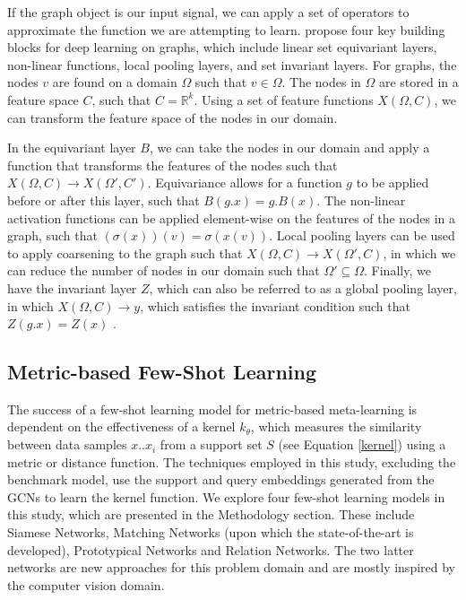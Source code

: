 If the graph object is our input signal, we can apply a set of operators to approximate the function we are attempting to learn. \citet{bronstein2021geometric} propose four key building blocks for deep learning on graphs, which include linear set equivariant layers, non-linear functions, local pooling layers, and set invariant layers. For graphs, the nodes $v$ are found on a domain $\Omega$ such that $v \in \Omega$. The nodes in $\Omega$ are stored in a feature space $C$, such that $C = \mathbb{R}^k$. Using a set of feature functions $X(\Omega, C)$, we can transform the feature space of the nodes in our domain. 

In the equivariant layer $B$, we can take the nodes in our domain and apply a function that transforms the features of the nodes such that $X(\Omega, C) \rightarrow X(\Omega', C')$. Equivariance allows for a function $g$ to be applied before or after this layer, such that $B(g.x) = g.B(x)$. The non-linear activation functions can be applied element-wise on the features of the nodes in a graph, such that $(\sigma(x))(v) = \sigma(x(v))$. Local pooling layers can be used to apply coarsening to the graph such that $X(\Omega, C) \rightarrow X(\Omega', C)$, in which we can reduce the number of nodes in our domain such that $\Omega' \subseteq \Omega$. Finally, we have the invariant layer $Z$, which can also be referred to as a global pooling layer, in which $X(\Omega, C) \rightarrow y$, which satisfies the invariant condition such that $Z(g.x) = Z(x)$ \citep{bronstein2021geometric}. 



\subsection{Metric-based Few-Shot Learning}

The success of a few-shot learning model for metric-based meta-learning is dependent on the effectiveness of a kernel $k_\theta$, which measures the similarity between data samples ${x..x_i}$ from a support set $S$ (see Equation \ref{kernel}) using a metric or distance function. The techniques employed in this study, excluding the benchmark model, use the support and query embeddings generated from the GCNs to learn the kernel function. We explore four few-shot learning models in this study, which are presented in the Methodology section. These include Siamese Networks, Matching Networks (upon which the state-of-the-art is developed), Prototypical Networks and Relation Networks. The two latter networks are new approaches for this problem domain and are mostly inspired by the computer vision domain.

